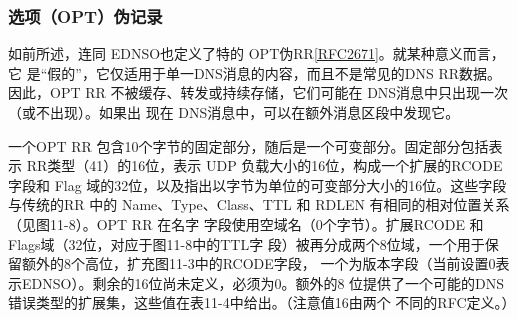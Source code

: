 \subsubsection{选项（OPT）伪记录}

如前所述，连同 EDNSO也定义了特的
OPT伪RR\href{https://www.rfc-editor.org/rfc/rfc2671}{[RFC2671]}。就某种意义而言，它
是“假的”，它仅适用于单一DNS消息的内容，而且不是常见的DNS RR数据。因此，OPT
RR 不被缓存、转发或持续存储，它们可能在 DNS消息中只出现一次（或不出现）。如果出
现在 DNS消息中，可以在额外消息区段中发现它。

一个OPT RR 包含10个字节的固定部分，随后是一个可变部分。固定部分包括表示
RR类型（41）的16位，表示 UDP 负载大小的16位，构成一个扩展的RCODE 字段和 Flag
域的32位，以及指出以字节为单位的可变部分大小的16位。这些字段与传统的RR 中的
Name、Type、Class、TTL 和 RDLEN 有相同的相对位置关系（见图11-8）。OPT RR 在名字
字段使用空域名（0个字节）。扩展RCODE 和Flags域（32位，对应于图11-8中的TTL字
段）被再分成两个8位域，一个用于保留额外的8个高位，扩充图11-3中的RCODE字段，
一个为版本字段（当前设置0表示EDNSO）。剩余的16位尚未定义，必须为0。额外的8
位提供了一个可能的DNS错误类型的扩展集，这些值在表11-4中给出。（注意值16由两个
不同的RFC定义。）

